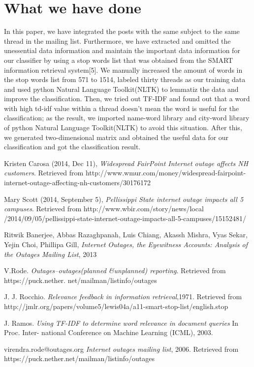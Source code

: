 \documentclass{sig-alternate}
\begin{document}
\section{What we have done}
In this paper, we have integrated the posts with the same subject to the same thread in the mailing list. Furthermore, we have extracted and omitted the unessential data information and maintain the important data information for our classifier by using a stop words list that was obtained from the SMART information retrieval system[5]. We manually increased the amount of words in the stop words list from 571 to 1514, labeled thirty threads as our training data and used python Natural Language Toolkit(NLTK) to lemmatiz the data and improve the classification. Then, we tried out TF-IDF and found out that a word with high td-idf value within a thread doesn't mean the word is useful for the classification; as the result, we imported name-word library and city-word library of python Natural Language Toolkit(NLTK) to avoid this situation. After this, we generated two-dimensional matrix and obtained the useful data for our classification and got the classification result.

\begin{thebibliography}{7}
Kristen Carosa (2014, Dec 11),
  \emph{Widespread FairPoint Internet outage affects NH customers}. Retrieved from http://www.wmur.com/money/widespread-fairpoint-internet-outage-affecting-nh-customers/30176172

Mary Scott (2014, September 5),
  \emph{Pellissippi State internet outage impacts all 5 campuses}.
Retrieved from http://www.wbir.com/story/news/local
\newline /2014/09/05/pellissippi-state-internet-outage-impacts-all-5-campuses/15152481/
  
Ritwik Banerjee, Abbas Razaghpanah, Luis Chiang, Akassh Mishra, Vyas Sekar, Yejin Choi, Phillipa Gill,
  \emph{Internet Outages, the Eyewitness Accounts: Analysis of the Outages Mailing List}, 2013
  
V.Rode.
\emph{Outages–outages(planned &unplanned) reporting}. 
Retrieved from https://puck.nether. net/mailman/listinfo/outages

  J. J. Rocchio.
  \emph{Relevance feedback in information retrieval},1971. Retrieved from http://jmlr.org/papers/volume5/lewis04a/a11-smart-stop-list/english.stop

  J. Ramos.
  \emph{Using TF-IDF to determine word relevance in document queries} In Proc. Inter- national Conference on Machine Learning (ICML), 2003.
  
  virendra.rode@outages.org
  \emph{Internet outages mailing list}, 2006. Retrieved from
https://puck.nether.net/mailman/listinfo/outages

\end{thebibliography}
\end{document}
